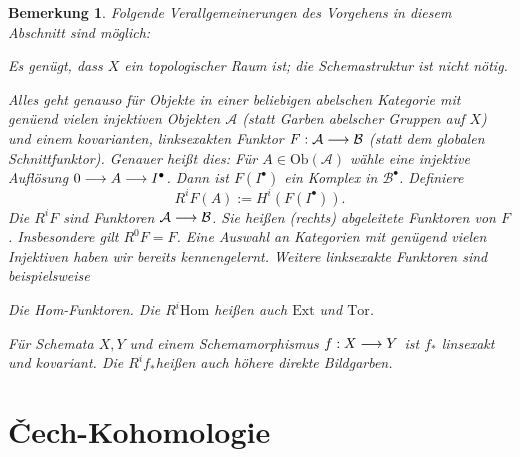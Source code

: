 \documentclass[11pt]{book}
\newtheorem{remark}[theorem]{Bemerkung}
\theoremstyle{nonumberbreak}
\newcommand{\Hom}{\mathrm{Hom} }
\begin{document}
\begin{spacing}{1.4}
\begin{remark}
Folgende Verallgemeinerungen des Vorgehens in diesem Abschnitt sind möglich:
\begin{compactenum}
\item Es genügt, dass $X$ ein topologischer Raum ist; die Schemastruktur ist nicht nötig.
\item Alles geht genauso für Objekte in einer beliebigen abelschen Kategorie mit genüend vielen injektiven Objekten $\mathcal{A}$ (statt Garben abelscher Gruppen auf $X$) und einem kovarianten, linksexakten Funktor $F: \mathcal{A} \longrightarrow \mathcal{B}$ (statt dem globalen Schnittfunktor). Genauer heißt dies: Für $A \in \mathrm{Ob}(\mathcal{A})$ wähle eine injektive Auflösung $0 \longrightarrow A \longrightarrow I^{\bullet}$. Dann ist $F(I^{\bullet})$ ein Komplex in $\mathcal{B}^{\bullet}$. Definiere
$$R^{i}F(A) := H^{i}(F(I^{\bullet})).$$
Die $R^{i}F$ sind Funktoren $\mathcal{A} \longrightarrow \mathcal{B}$. Sie heißen (rechts) abgeleitete Funktoren von $F$. Insbesondere gilt $R^{0}F=F$. Eine Auswahl an Kategorien mit genügend vielen Injektiven haben wir bereits kennengelernt. Weitere linksexakte Funktoren sind beispielsweise
\begin{compactenum}
\item Die Hom-Funktoren. Die $R^{i}\Hom$ heißen auch $\mathrm{Ext}$ und $\mathrm{Tor}$.
\item Für Schemata $X,Y$ und einem Schemamorphismus $f: X \longrightarrow Y$ ist $f_{*}$ linsexakt und kovariant. Die $R^{i}f_{*}$heißen auch höhere direkte Bildgarben.
\end{compactenum}

\end{compactenum}
\end{remark}







\renewcommand*\thesection{§ \arabic{section}\quad}
\section{\v{C}ech-Kohomologie} %
\renewcommand*\thesection{\arabic{section}}

\newcommand{\cechk}{C^{k}( \mathfrak{U}, \F)}
\newcommand{\cechkk}{C^{k+1}( \mathfrak{U}, \F)}


\end{spacing}
\end{document}

